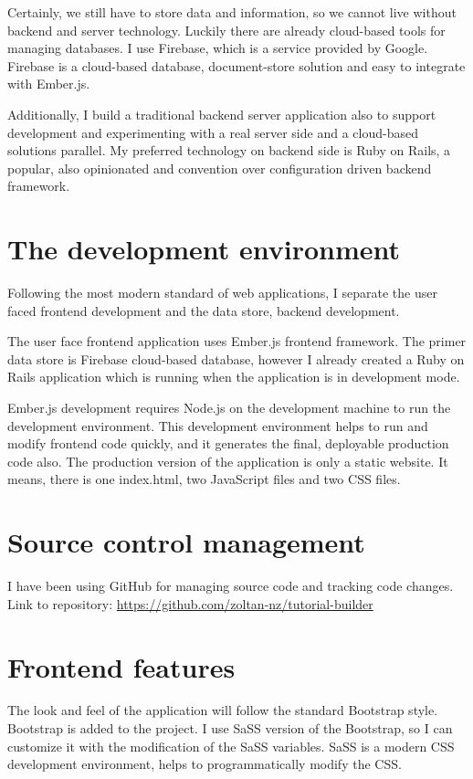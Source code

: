 \documentclass[11pt, a4paper, twoside, openright]{report}
\begin{document}
Certainly, we still have to store data and information, so we cannot live without backend and server technology. Luckily there are already cloud-based tools for managing databases. I use Firebase, which is a service provided by Google. Firebase is a cloud-based database, document-store solution and easy to integrate with Ember.js.

Additionally, I build a traditional backend server application also to support development and experimenting with a real server side and a cloud-based solutions parallel. My preferred technology on backend side is Ruby on Rails, a popular, also opinionated and convention over configuration driven backend framework.


\section{The development environment}

Following the most modern standard of web applications, I separate the user faced frontend development and the data store, backend development.

The user face frontend application uses Ember.js frontend framework. The primer data store is Firebase cloud-based database, however I already created a Ruby on Rails application which is running when the application is in development mode.

Ember.js development requires Node.js on the development machine to run the development environment. This development environment helps to run and modify frontend code quickly, and it generates the final, deployable production code also. The production version of the application is only a static website. It means, there is one index.html, two JavaScript files and two CSS files.

\section{Source control management}

I have been using GitHub for managing source code and tracking code changes. Link to repository: \url{https://github.com/zoltan-nz/tutorial-builder}

\section{Frontend features}

The look and feel of the application will follow the standard Bootstrap style. Bootstrap is added to the project. I use SaSS version of the Bootstrap, so I can customize it with the modification of the SaSS variables. SaSS is a modern CSS development environment, helps to programmatically modify the CSS.
\end{document}
